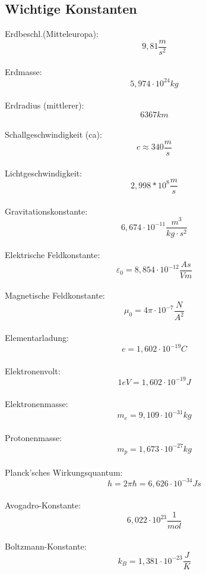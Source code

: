 \documentclass[12pt,a4paper,oneside]{article}
\begin{document}
\subsection*{Wichtige Konstanten}
\begin{multicols}{3}
 Erdbeschl.(Mitteleuropa): $$ 9,81 \frac{m}{s^2} $$ \\
 Erdmasse: $$ 5,974 \cdot 10^{24} kg $$ \\
 Erdradius (mittlerer): $$ 6367 km $$ \\
 Schallgeschwindigkeit (ca): $$ c \approx 340\frac{m}{s} $$ \\
 Lichtgeschwindigkeit: $$ 2,998*10^8 \frac{m}{s} $$ \\
 Gravitationskonstante: $$ 6,674\cdot 10^{-11}\frac{m^3}{kg \cdot s^2} $$\\
 Elektrische Feldkonstante: $$ \varepsilon_0 = 8,854\cdot 10^{-12}\frac{As}{Vm} $$ \\
 Magnetische Feldkonstante: $$ \mu_0 = 4 \pi \cdot 10^{-7}\frac{N}{A^2} $$ \\
 Elementarladung: $$ e = 1,602\cdot 10^{-19} C $$ \\
 Elektronenvolt: $$ 1eV = 1,602\cdot 10^{-19}J $$ \\
 Elektronenmasse: $$ m_e = 9,109\cdot 10^{-31} kg $$ \\
 Protonenmasse: $$ m_p = 1,673 \cdot 10^{-27} kg $$ \\
 Planck'sches Wirkungsquantum: $$ h = 2\pi\hbar = 6,626\cdot 10^{-34}Js $$ \\
 Avogadro-Konstante: $$ 6,022\cdot 10^{23} \frac{1}{mol}$$ \\
 Boltzmann-Konstante: $$ k_B = 1,381\cdot 10^{-23} \frac{J}{K} $$
\end{multicols}

\end{document}
